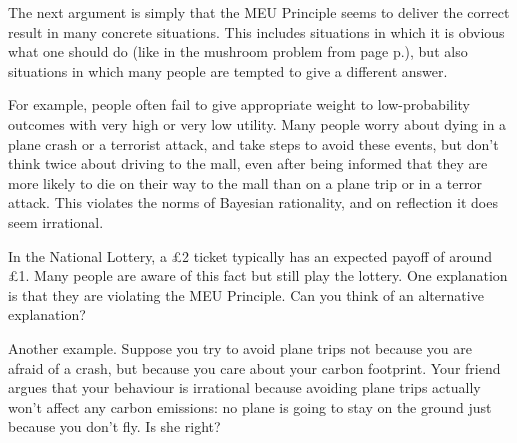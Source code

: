 The next argument is simply that the MEU Principle seems to deliver
the correct result in many concrete situations. This includes
situations in which it is obvious what one should do (like in the
mushroom problem from page p.\pageref{ex:mushroom}), but also
situations in which many people are tempted to give a different
answer.



For example, people often fail to give appropriate weight to
low-probability outcomes with very high or very low utility. Many
people worry about dying in a plane crash or a terrorist attack, and
take steps to avoid these events, but don't think twice about driving
to the mall, even after being informed that they are more likely to
die on their way to the mall than on a plane trip or in a terror
attack. This violates the norms of Bayesian rationality, and on
reflection it does seem irrational.

\begin{exercise1}
  In the National Lottery, a £2 ticket typically has an expected
  payoff of around £1. Many people are aware of this fact but still
  play the lottery. One explanation is that they are violating the MEU
  Principle. Can you think of an alternative explanation?
\end{exercise1}

Another example. Suppose you try to avoid plane trips not because you
are afraid of a crash, but because you care about your carbon
footprint. Your friend argues that your behaviour is irrational
because avoiding plane trips actually won't affect any carbon
emissions: no plane is going to stay on the ground just because you
don't fly. Is she right?

